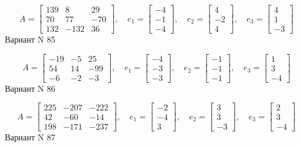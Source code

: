 \documentclass[11pt]{report}
\begin{document}
$$A = \left[\begin{matrix}139 & 8 & 29\\70 & 77 & -70\\132 & -132 & 36\end{matrix}\right],\quad e_1 = \left[\begin{matrix}-4\\-1\\-4\end{matrix}\right],\quad e_2 = \left[\begin{matrix}4\\-2\\4\end{matrix}\right],\quad e_3 = \left[\begin{matrix}4\\1\\-3\end{matrix}\right]$$Вариант N 85

$$A = \left[\begin{matrix}-19 & -5 & 25\\54 & 14 & -99\\-6 & -2 & -3\end{matrix}\right],\quad e_1 = \left[\begin{matrix}-4\\-3\\-3\end{matrix}\right],\quad e_2 = \left[\begin{matrix}-1\\-1\\-1\end{matrix}\right],\quad e_3 = \left[\begin{matrix}1\\3\\-4\end{matrix}\right]$$Вариант N 86

$$A = \left[\begin{matrix}225 & -207 & -222\\42 & -60 & -14\\198 & -171 & -237\end{matrix}\right],\quad e_1 = \left[\begin{matrix}-2\\-4\\3\end{matrix}\right],\quad e_2 = \left[\begin{matrix}3\\3\\-3\end{matrix}\right],\quad e_3 = \left[\begin{matrix}2\\3\\-4\end{matrix}\right]$$Вариант N 87
\end{document}
